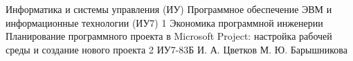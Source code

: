 \makereporttitle
{Информатика и системы управления (ИУ)}
{Программное обеспечение ЭВМ и информационные технологии (ИУ7)}
{1}
{Экономика программной инженерии}
{Планирование программного проекта в Microsoft Project: настройка рабочей среды и создание нового проекта}
{2}
{ИУ7-83Б}
{И. А. Цветков}
{М. Ю. Барышникова}
{}
{}
